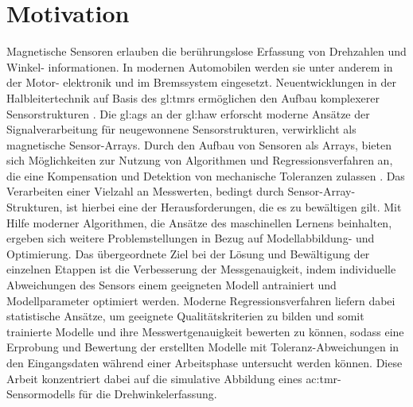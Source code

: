 %

\chapter{Motivation}\label{ch:motivation}


Magnetische Sensoren erlauben die berührungslose Erfassung von Drehzahlen und Winkel-
informationen. In modernen Automobilen werden sie unter anderem in der Motor-
\newline
elektronik und im Bremssystem eingesetzt. Neuentwicklungen in der Halbleitertechnik auf Basis des \gls{gl:tmr}s ermöglichen den Aufbau komplexerer Sensorstrukturen \cite{Schuethe2019}. Die \gls{gl:ags} an der \gls{gl:haw} erforscht moderne Ansätze der Signalverarbeitung für neugewonnene Sensorstrukturen, verwirklicht als magnetische Sensor-Arrays. Durch den Aufbau von Sensoren als Arrays, bieten sich Möglichkeiten zur Nutzung von Algorithmen und Regressionsverfahren an, die eine Kompensation und Detektion von mechanische Toleranzen zulassen \cite{Schuethe2020}.
\newline
Das Verarbeiten einer Vielzahl an Messwerten, bedingt durch Sensor-Array-Strukturen, ist hierbei eine der Herausforderungen, die es zu bewältigen gilt. Mit Hilfe moderner Algorithmen, die Ansätze des maschinellen Lernens beinhalten, ergeben sich weitere Problemstellungen in Bezug auf Modellabbildung- und Optimierung.
Das übergeordnete Ziel bei der Lösung und Bewältigung der einzelnen Etappen ist die Verbesserung der Messgenauigkeit, indem individuelle Abweichungen des Sensors einem geeigneten Modell antrainiert und Modellparameter optimiert werden.
\newline
Moderne Regressionsverfahren liefern dabei statistische Ansätze, um geeignete Qualitätskriterien zu bilden und somit trainierte Modelle und ihre Messwertgenauigkeit bewerten zu können, sodass eine Erprobung und Bewertung der erstellten Modelle mit Toleranz-Abweichungen in den Eingangsdaten während einer Arbeitsphase untersucht werden können.
Diese Arbeit konzentriert dabei auf die simulative Abbildung eines \gls{ac:tmr}-Sensormodells für die Drehwinkelerfassung.


\clearpage



